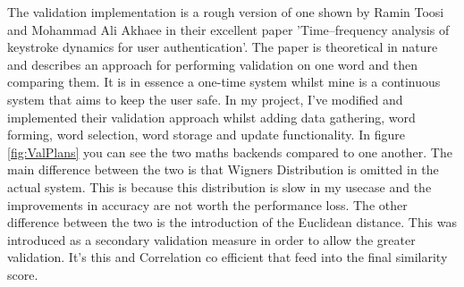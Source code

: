 \documentclass[10pt,a4paper]{report}
\begin{document}
The validation implementation is a rough version of one shown by Ramin Toosi and Mohammad Ali Akhaee in their excellent paper 'Time–frequency analysis of keystroke dynamics for user authentication'. \cite{ToosiRamin2021Taok} The paper is theoretical in nature and describes an approach for performing validation on one word and then comparing them. It is in essence a one-time system whilst mine is a continuous system that aims to keep the user safe. In my project, I've modified and implemented their validation approach whilst adding data gathering, word forming, word selection, word storage and update functionality. In figure \ref{fig:ValPlans} you can see the two maths backends compared to one another. The main difference between the two is that Wigners Distribution is omitted in the actual system. This is because this distribution is slow in my usecase and the improvements in accuracy are not worth the performance loss. The other difference between the two is the introduction of the Euclidean distance. This was introduced as a secondary validation measure in order to allow the greater validation. It's this and Correlation co efficient that feed into the final similarity score.
\end{document}
